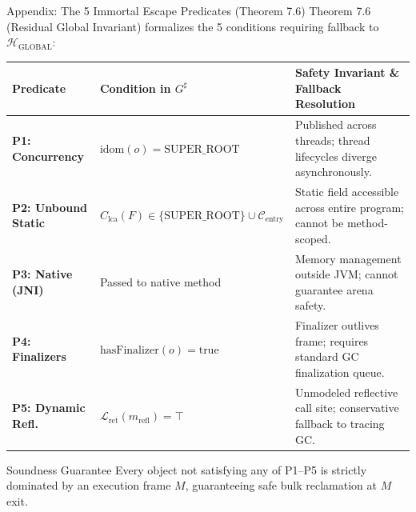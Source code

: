 \documentclass[11pt]{beamer}
\begin{document}
\begin{frame}{Appendix: The 5 Immortal Escape Predicates (Theorem 7.6)}
  \footnotesize Theorem 7.6 (Residual Global Invariant) formalizes the 5 conditions requiring fallback to $\mathcal{H}_{\text{GLOBAL}}$:

  \vspace{-0.3em}
  \begin{table}[h]
    \centering
    \tiny
    \setlength{\tabcolsep}{3pt}
    \renewcommand{\arraystretch}{1.12}
    \begin{tabular}{@{}llp{5.4cm}@{}}
      \toprule
      \textbf{Predicate} & \textbf{Condition in $G^\sharp$} & \textbf{Safety Invariant \& Fallback Resolution} \\
      \midrule
      \textbf{P1: Concurrency} & $\text{idom}(o) = \text{SUPER\_ROOT}$ & Published across threads; thread lifecycles diverge asynchronously. \\
      \textbf{P2: Unbound Static} & $C_{\text{lca}}(F) \in \{\text{SUPER\_ROOT}\} \cup \mathcal{C}_{\text{entry}}$ & Static field accessible across entire program; cannot be method-scoped. \\
      \textbf{P3: Native (JNI)} & Passed to native method & Memory management outside JVM; cannot guarantee arena safety. \\
      \textbf{P4: Finalizers} & $\text{hasFinalizer}(o) = \text{true}$ & Finalizer outlives frame; requires standard GC finalization queue. \\
      \textbf{P5: Dynamic Refl.} & $\mathcal{L}_{\text{ret}}(m_{\text{refl}}) = \top$ & Unmodeled reflective call site; conservative fallback to tracing GC. \\
      \bottomrule
    \end{tabular}
  \end{table}

  \vspace{-0.5em}
  \begin{block}{Soundness Guarantee}
    \scriptsize
    Every object not satisfying any of P1--P5 is strictly dominated by an execution frame $M$, guaranteeing safe bulk reclamation at $M$ exit.
  \end{block}
\end{frame}
\end{document}
